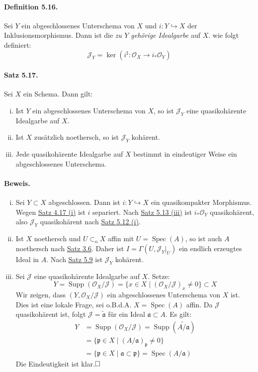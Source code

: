 \documentclass[11pt,b5paper,openany]{memoir}
\def \qed {$\hfill\square$}
\begin{document}
\paragraph{Definition 5.16.}\label{5.16} Sei $Y$ ein abgeschlossenes Unterschema von $X$ und $i:Y\hookrightarrow X$ der Inklusionsmorphismus. Dann ist die \textit{zu $Y$ gehörige Idealgarbe} auf $X$. wie folgt definiert:
\[\mathcal{J}_Y=\ker(i^\sharp:\mathcal{O}_X\to i_\ast\mathcal{O}_Y) \]

\paragraph{Satz 5.17.}\label{5.17} Sei $X$ ein Schema. Dann gilt:
\begin{enumerate}[(i)]
\item Ist $Y$ ein abgeschlossenes Unterschema von $X$, so ist $\mathcal{J}_Y$ eine quasikohärente Idealgarbe auf $X$.
\item Ist $X$ zusätzlich noethersch, so ist $\mathcal{J}_Y$ kohärent.
\item Jede quasikohärente Idealgarbe auf $X$ bestimmt in eindeutiger Weise ein abgeschlossenes Unterschema.
\end{enumerate}

\paragraph{Beweis.}\begin{enumerate}[(i)]
\item Sei $Y\subset X$ abgeschlossen. Dann ist $i:Y\hookrightarrow X$ ein quasikompakter Morphismus. Wegen \hyperref[4.17]{Satz 4.17 (i)} ist $i$ separiert. Nach \hyperref[5.13]{Satz 5.13 (iii)} ist $i_\ast\mathcal{O}_Y$ quasikohärent, also $\mathcal{J}_Y$ quasikohärent nach \hyperref[5.12]{Satz 5.12 (i)}.
\item Ist $X$ noethersch und $U\subset_\text{o}X$ affin mit $U=\operatorname{Spec}(A)$, so ist auch $A$ noethersch nach \hyperref[3.6]{Satz 3.6}. Daher ist $I=\Gamma(U,\mathcal{J}_Y|_U)$ ein endlich erzeugtes Ideal in $A$. Nach \hyperref[5.9]{Satz 5.9} ist $\mathcal{J}_Y$ kohärent.
\item Sei $\mathcal{J}$ eine quasikohärente Idealgarbe auf $X$. Setze:
\[Y=\operatorname{Supp}(\mathcal{O}_X/\mathcal{J})=\{x\in X\mid (\mathcal{O}_X/\mathcal{J})_x\neq 0 \}\subset X \]
Wir zeigen, dass $(Y,\mathcal{O}_X/\mathcal{J})$ ein abgeschlossenes Unterschema von $X$ ist. Dies ist eine lokale Frage, sei o.B.d.A. $X=\operatorname{Spec}(A)$ affin. Da $\mathcal{J}$ quasikohärent ist, folgt $\mathcal{J}=\widetilde{\mathfrak{a}}$ für ein Ideal $\mathfrak{a}\subset A$. Es gilt:
\begin{align*}
Y&=\operatorname{Supp}(\mathcal{O}_X/\mathcal{J})=\operatorname{Supp}(\widetilde{A/\mathfrak{a}})\\
&= \{\mathfrak{p}\in X\mid (A/\mathfrak{a})_\mathfrak{p}\neq 0\}\\
&=\{\mathfrak{p}\in X\mid\mathfrak{a}\subset\mathfrak{p}\}=\operatorname{Spec}(A/\mathfrak{a})
\end{align*}
Die Eindeutigkeit ist klar.\qed
\end{enumerate}
\end{document}
